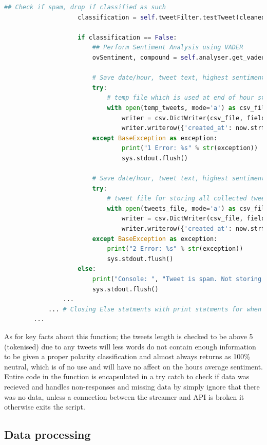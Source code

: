 \documentclass[oneside, 12pt]{article}
\begin{document}
\begin{lstlisting}[language=python, caption=Tweepy Stream: 'on\_data' method]
					## Check if spam, drop if classified as such
					classification = self.tweetFilter.testTweet(cleanedTweet)
			
					if classification == False:
						## Perform Sentiment Analysis using VADER
						ovSentiment, compound = self.analyser.get_vader_sentiment(cleanedTweet)
									
						# Save date/hour, tweet text, highest sentiment score from Positive or Negative and compound score
						try:
							# temp file which is used at end of hour streaming to average sentiment for hour
							with open(temp_tweets, mode='a') as csv_file:
								writer = csv.DictWriter(csv_file, fieldnames=temp_fieldnames)
								writer.writerow({'created_at': now.strftime("%Y-%m-%d %H:%M:%S"), 'tweet': cleanedTweet, 'sentiment': ovSentiment, 'compound': compound})
						except BaseException as exception:
								print("1 Error: %s" % str(exception))
								sys.stdout.flush()
									
						# Save date/hour, tweet text, highest sentiment score from Positive or Negative and compound score
						try:
							# tweet file for storing all collected tweets from every hour
							with open(tweets_file, mode='a') as csv_file:
								writer = csv.DictWriter(csv_file, fieldnames=fieldnames_tweet)
								writer.writerow({'created_at': now.strftime("%Y-%m-%d %H:%M:%S"), 'tweet': cleanedTweet, 'sentiment': ovSentiment, 'compound': compound})
						except BaseException as exception:
							print("2 Error: %s" % str(exception))
							sys.stdout.flush()
					else:
						print("Console: ", "Tweet is spam. Not storing tweet in dataset")
						sys.stdout.flush()
				...
			... # Closing Else statments with print statments for when the tweet doesn't meet criteria
		...
			\end{lstlisting}
			
			As for key facts about this function; the tweets length is checked to be above 5 (tokenised) due to any tweets will less words do not contain enough information to be given a proper polarity classification and almost always returns as 100\% neutral, which is of no use and will have no affect on the hours average sentiment. Entire code in the function is encapsulated in a try catch to check if data was recieved and handles non-responses and missing data by simply ignore that there was no data, unless a connection between the streamer and API is broken it otherwise exits the script.	
			
		\newpage
		\subsection{Data processing}\label{processing}
\end{document}
